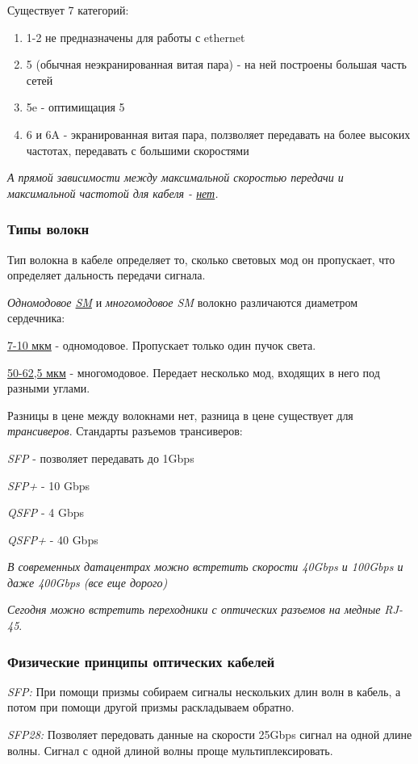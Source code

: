 \documentclass[a4paper,10pt]{article}
\begin{document}
	Существует 7 категорий:
	\begin{enumerate}
		\item 1-2 не предназначены для работы с ethernet
		\item 5 (обычная неэкранированная витая пара) - на ней построены большая часть сетей
		\item 5e - оптимищация 5
		\item 6 и 6A - экранированная витая пара, ползволяет передавать на более высоких частотах, передавать с большими скоростями
	\end{enumerate}
	
	\textit{А прямой зависимости между максимальной скоростью передачи и максимальной частотой для кабеля - \underline{нет}.}
	
	\subsubsection{Типы волокн}
	Тип волокна в кабеле определяет то, сколько световых мод он пропускает, что определяет дальность передачи сигнала.
	
	\emph{Одномодовое \underline{SM}} и \emph{многомодовое \emph{SM}} волокно различаются диаметром сердечника:
	
	\underline{7-10 мкм} - одномодовое. Пропускает только один пучок света.
	
	\underline{50-62,5 мкм} - многомодовое. Передает несколько мод, входящих в него под разными углами.
	
	Разницы в цене между волокнами нет, разница в цене существует для \emph{трансиверов}. Стандарты разъемов трансиверов:
	
	\emph{SFP} - позволяет передавать до 1Gbps
	
	\emph{SFP+} - 10 Gbps
	
	\emph{QSFP} - 4 Gbps
	
	\emph{QSFP+} - 40 Gbps
	
	\textit{В современных датацентрах можно встретить скорости 40Gbps и 100Gbps и даже 400Gbps (все еще дорого)}
	
	\textit{Сегодня можно встретить переходники с оптических разъемов на медные RJ-45}.
	
	\subsubsection{Физические принципы оптических кабелей}
	 \emph{SFP:} При помощи призмы собираем сигналы нескольких длин волн в кабель, а потом при помощи другой призмы раскладываем обратно.
	 
	 \emph{SFP28:} Позволяет передовать данные на скорости 25Gbps сигнал на одной длине волны. Сигнал с одной длиной волны проще мультиплексировать.
\end{document}

